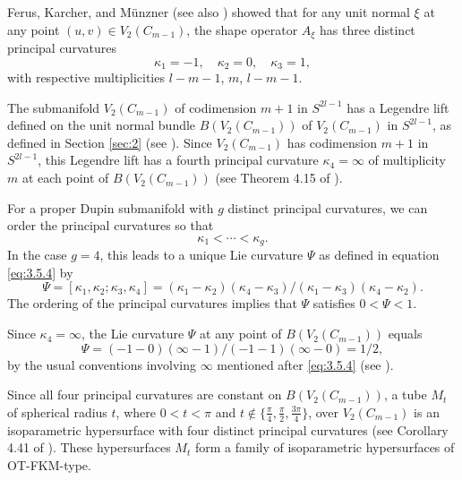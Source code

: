 \documentclass[12pt]{article}
\begin{document}
Ferus, Karcher, and M\"{u}nzner \cite{FKM} (see also \cite[pp.109--110]{Cec1}) 
showed that for any unit normal $\xi$ at any point $(u,v) \in V_2 (C_{m-1})$,
the shape operator $A_\xi$ has three distinct principal curvatures 
\begin{equation} 
\label{eq:3.7.4}
\kappa_1 = -1, \quad \kappa_2 = 0, \quad \kappa_3 = 1,
\end{equation}
with respective multiplicities $l-m-1$, $m$, $l-m-1$.  

The submanifold $V_2 (C_{m-1})$ of codimension $m+1$ in $S^{2l-1}$ has a Legendre lift
defined on the unit normal bundle 
$B(V_2 (C_{m-1}))$ of $V_2 (C_{m-1})$ in $S^{2l-1}$, as defined in Section \ref{sec:2} (see \cite[pp. 60--61]{Cec1}). 
Since $V_2 (C_{m-1})$ has codimension $m+1$ in $S^{2l-1}$,
this Legendre lift has a fourth principal curvature $\kappa_4 = \infty$ of multiplicity $m$ at each point of  
$B(V_2 (C_{m-1}))$ (see Theorem 4.15 of \cite[p. 74]{Cec1}).

For a  proper Dupin submanifold with $g$ distinct principal curvatures, we can order the principal curvatures so that 
\begin{equation}
\label{eq:3.5.9a}
\kappa_1 < \cdots < \kappa_g.
\end{equation}
In the case $g=4$, this leads to a unique Lie curvature $\Psi$ as defined in equation \eqref{eq:3.5.4} by
\begin{equation}
\label{eq:3.5.10}
\Psi = [\kappa_1, \kappa_2; \kappa_3, \kappa_4] = 
(\kappa_1 - \kappa_2)(\kappa_4 - \kappa_3)/(\kappa_1 - \kappa_3)(\kappa_4 - \kappa_2).
\end{equation}
The ordering of the principal curvatures implies that $\Psi$ satisfies $0 < \Psi < 1$. 


Since $\kappa_4 = \infty$, the Lie curvature
$\Psi$ at any point of $B(V_2 (C_{m-1}))$
equals 
\begin{equation}
\label{eq:3.7.5}
\Psi =  (-1 - 0)(\infty - 1) / (-1 - 1)(\infty - 0) = 1/2,
\end{equation}
by the usual conventions involving $\infty$ mentioned after \eqref{eq:3.5.4} (see \cite[pp.72--82]{Cec1}).

Since all four principal curvatures are constant on $B(V_2 (C_{m-1}))$, 
a tube $M_t$ of spherical radius $t$,
where $0 < t < \pi$ and $t\notin \{\frac{\pi}{4}, \frac{\pi}{2}, 
\frac{3 \pi}{4} \}$, over $V_2 (C_{m-1})$ is an isoparametric hypersurface with four distinct principal curvatures
(see Corollary 4.41 of \cite[p. 111]{Cec1}).  These hypersurfaces $M_t$ form a family
of isoparametric hypersurfaces of OT-FKM-type.
\end{document}
